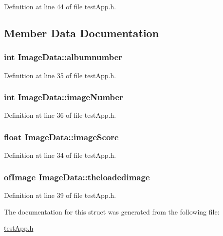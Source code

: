 Definition at line 44 of file test\-App.\-h.



\subsection{Member Data Documentation}
\hypertarget{struct_image_data_a372655668350953b85fda1f07cd3ffe1}{
\subsubsection[{albumnumber}]{\setlength{\rightskip}{0pt plus 5cm}int Image\-Data\-::albumnumber}}\label{struct_image_data_a372655668350953b85fda1f07cd3ffe1}


Definition at line 35 of file test\-App.\-h.

\hypertarget{struct_image_data_a254eb9353be246c69591d51088683397}{
\subsubsection[{image\-Number}]{\setlength{\rightskip}{0pt plus 5cm}int Image\-Data\-::image\-Number}}\label{struct_image_data_a254eb9353be246c69591d51088683397}


Definition at line 36 of file test\-App.\-h.

\hypertarget{struct_image_data_a7161728d2f1bd4240bd9359f6276dd3b}{
\subsubsection[{image\-Score}]{\setlength{\rightskip}{0pt plus 5cm}float Image\-Data\-::image\-Score}}\label{struct_image_data_a7161728d2f1bd4240bd9359f6276dd3b}


Definition at line 34 of file test\-App.\-h.

\hypertarget{struct_image_data_acf1bde00dd79a0960269618d9b885f61}{
\subsubsection[{theloadedimage}]{\setlength{\rightskip}{0pt plus 5cm}of\-Image Image\-Data\-::theloadedimage}}\label{struct_image_data_acf1bde00dd79a0960269618d9b885f61}


Definition at line 39 of file test\-App.\-h.



The documentation for this struct was generated from the following file\-:\begin{DoxyCompactItemize}
\item 
\hyperlink{test_app_8h}{test\-App.\-h}\end{DoxyCompactItemize}
